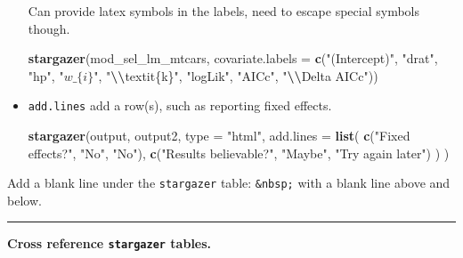 \documentclass[
  a4paper,
  twoside,
  openright]{book}
\newenvironment{Shaded}{\begin{snugshade}}{\end{snugshade}}
\newcommand{\AttributeTok}[1]{\textcolor[rgb]{0.13,0.29,0.53}{#1}}
\newcommand{\FunctionTok}[1]{\textcolor[rgb]{0.13,0.29,0.53}{\textbf{#1}}}
\newcommand{\NormalTok}[1]{#1}
\newcommand{\SpecialCharTok}[1]{\textcolor[rgb]{0.81,0.36,0.00}{\textbf{#1}}}
\newcommand{\StringTok}[1]{\textcolor[rgb]{0.31,0.60,0.02}{#1}}
\theoremstyle{definition}
\theoremstyle{definition}
\theoremstyle{definition}
\theoremstyle{definition}
\theoremstyle{remark}
\begin{document}
\begin{itemize}
  Can provide latex symbols in the labels, need to escape special symbols though.

\begin{Shaded}
\begin{Highlighting}[]
\FunctionTok{stargazer}\NormalTok{(mod\_sel\_lm\_mtcars, }
          \AttributeTok{covariate.labels =} 
          \FunctionTok{c}\NormalTok{(}\StringTok{"(Intercept)"}\NormalTok{, }\StringTok{"drat"}\NormalTok{, }\StringTok{"hp"}\NormalTok{, }\StringTok{"$w\_\{i\}$"}\NormalTok{,}
            \StringTok{"}\SpecialCharTok{\textbackslash{}\textbackslash{}}\StringTok{textit\{k\}"}\NormalTok{, }\StringTok{"logLik"}\NormalTok{, }\StringTok{"AICc"}\NormalTok{, }\StringTok{"}\SpecialCharTok{\textbackslash{}\textbackslash{}}\StringTok{Delta AICc"}\NormalTok{))}
\end{Highlighting}
\end{Shaded}
\item
  \texttt{add.lines} add a row(s), such as reporting fixed effects.

\begin{Shaded}
\begin{Highlighting}[]
\FunctionTok{stargazer}\NormalTok{(output, output2, }\AttributeTok{type =} \StringTok{"html"}\NormalTok{,}
          \AttributeTok{add.lines =} \FunctionTok{list}\NormalTok{(}
            \FunctionTok{c}\NormalTok{(}\StringTok{"Fixed effects?"}\NormalTok{, }\StringTok{"No"}\NormalTok{, }\StringTok{"No"}\NormalTok{),}
            \FunctionTok{c}\NormalTok{(}\StringTok{"Results believable?"}\NormalTok{, }\StringTok{"Maybe"}\NormalTok{, }\StringTok{"Try again later"}\NormalTok{)}
\NormalTok{            )}
\NormalTok{          )}
\end{Highlighting}
\end{Shaded}
\end{itemize}

Add a blank line under the \texttt{stargazer} table: \texttt{\&nbsp;} with a blank line above and below.

\begin{center}\rule{0.5\linewidth}{0.5pt}\end{center}

\textbf{Cross reference \texttt{stargazer} tables.}
\end{document}
